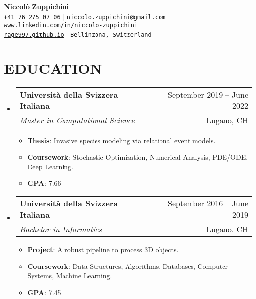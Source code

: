 \documentclass[letterpaper,10pt]{article}
\makeatletter
\newcommand{\resumeItem}[1]{
  \item\small{
    {#1 \vspace{-1pt}}
  }
}
\newcommand{\resumeSubheading}[4]{
  \vspace{-1pt}\item
    \begin{tabular*}{\textwidth}[t]{l@{\extracolsep{\fill}}r}
      \textbf{#1} & {\color{dark-grey}\small #2}\vspace{1pt}\\ %
      \textit{#3} & {\color{dark-grey} \small #4}\\ %
    \end{tabular*}\vspace{-4pt}
}
\newcommand{\resumeSubHeadingListStart}{\begin{itemize}[leftmargin=0in, label={}]}
\newcommand{\resumeSubHeadingListEnd}{\end{itemize}}
\newcommand{\resumeItemListStart}{\begin{itemize}}
\newcommand{\resumeItemListEnd}{\end{itemize}}
\makeatother
\begin{document}
\begin{center}
    \textbf{\Huge Niccol\`o Zuppichini} \\ \vspace{5pt}
    \small \faPhone* \texttt{+41 76 275 07 06} \hspace{1pt} $|$
    \hspace{1pt} \faEnvelope \hspace{2pt} \texttt{niccolo.zuppichini@gmail.com} \hspace{1pt}  \\
    \hspace{1pt} \faLinkedin \hspace{2pt} \texttt{\href{https://www.linkedin.com/in/niccolo-zuppichini}{www.linkedin.com/in/niccolo-zuppichini}} \hspace{1pt} \\
    \hspace{1pt} \faHome \hspace{2pt}\texttt{\href{https://rage997.github.io/}{rage997.github.io}}   \hspace{1pt} $|$
    \hspace{1pt} \faMapMarker* \hspace{2pt}\texttt{Bellinzona, Switzerland}
    \\ \vspace{-3pt}
\end{center}


\section {EDUCATION}
 \resumeSubHeadingListStart
    \resumeSubheading
      {Universit\`a della Svizzera Italiana}{September 2019 -- June 2022}
      {Master in Computational Science}{Lugano, CH}
      	\resumeItemListStart
      	\resumeItem 
            {\textbf{Thesis}: \href{https://github.com/Rage997/MasterThesis}{Invasive species modeling via relational event models.}}
    	\resumeItem {\textbf{Coursework}: Stochastic Optimization, Numerical Analysis, PDE/ODE, Deep Learning.}
    	\resumeItem{\textbf{GPA}: 7.66}
        \resumeItemListEnd
  \resumeSubHeadingListEnd
\resumeSubHeadingListStart
    \resumeSubheading
      {Universit\`a della Svizzera Italiana}{September 2016 -- June 2019}
      {Bachelor in Informatics}{Lugano, CH}
      	\resumeItemListStart
      	\resumeItem 
            {\textbf{Project}: \href{https://github.com/Rage997/BachelorProject}{A robust pipeline to process 3D objects.}}
    	\resumeItem {\textbf{Coursework}: Data Structures, Algorithms, Databases, Computer Systems, Machine Learning.}
    	 \resumeItem{\textbf{GPA}: 7.45}
        \resumeItemListEnd
  \resumeSubHeadingListEnd
\end{document}
